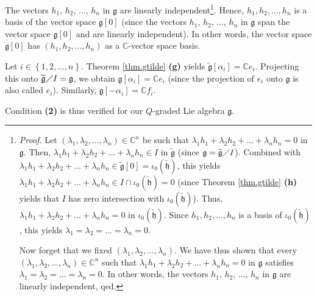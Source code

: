 \documentclass[etingof-lie.tex]{subfiles}
\begin{document}
The vectors $h_{1}$, $h_{2}$, $...$, $h_{n}$ in $\mathfrak{g}$ are linearly
independent\footnote{\textit{Proof.} Let $\left(  \lambda_{1},\lambda
_{2},...,\lambda_{n}\right)  \in\mathbb{C}^{n}$ be such that $\lambda_{1}%
h_{1}+\lambda_{2}h_{2}+...+\lambda_{n}h_{n}=0$ in $\mathfrak{g}$. Then,
$\lambda_{1}h_{1}+\lambda_{2}h_{2}+...+\lambda_{n}h_{n}\in I$ in
$\widetilde{\mathfrak{g}}$ (since $\mathfrak{g}=\widetilde{\mathfrak{g}%
}\diagup I$). Combined with $\lambda_{1}h_{1}+\lambda_{2}h_{2}+...+\lambda
_{n}h_{n}\in\widetilde{\mathfrak{g}}\left[  0\right]  =\iota_{0}\left(
\widetilde{\mathfrak{h}}\right)  $, this yields $\lambda_{1}h_{1}+\lambda
_{2}h_{2}+...+\lambda_{n}h_{n}\in I\cap\iota_{0}\left(
\widetilde{\mathfrak{h}}\right)  =0$ (since Theorem \ref{thm.gtilde}
\textbf{(h)} yields that $I$ has zero intersection with $\iota_{0}\left(
\widetilde{\mathfrak{h}}\right)  $). Thus, $\lambda_{1}h_{1}+\lambda_{2}%
h_{2}+...+\lambda_{n}h_{n}=0$ in $\iota_{0}\left(  \widetilde{\mathfrak{h}%
}\right)  $. Since $h_{1},h_{2},...,h_{n}$ is a basis of $\iota_{0}\left(
\widetilde{\mathfrak{h}}\right)  $, this yields $\lambda_{1}=\lambda
_{2}=...=\lambda_{n}=0$.
\par
Now forget that we fixed $\left(  \lambda_{1},\lambda_{2},...,\lambda
_{n}\right)  $. We have thus shown that every $\left(  \lambda_{1},\lambda
_{2},...,\lambda_{n}\right)  \in\mathbb{C}^{n}$ such that $\lambda_{1}%
h_{1}+\lambda_{2}h_{2}+...+\lambda_{n}h_{n}=0$ in $\mathfrak{g}$ satisfies
$\lambda_{1}=\lambda_{2}=...=\lambda_{n}=0$. In other words, the vectors
$h_{1}$, $h_{2}$, $...$, $h_{n}$ in $\mathfrak{g}$ are linearly independent,
qed.}. Hence, $h_{1},h_{2},...,h_{n}$ is a basis of the vector space
$\mathfrak{g}\left[  0\right]  $ (since the vectors $h_{1}$, $h_{2}$, $...$,
$h_{n}$ in $\mathfrak{g}$ span the vector space $\mathfrak{g}\left[  0\right]
$ and are linearly independent). In other words, the vector space
$\mathfrak{g}\left[  0\right]  $ has $\left(  h_{1},h_{2},...,h_{n}\right)  $
as a $\mathbb{C}$-vector space basis.

Let $i\in\left\{  1,2,...,n\right\}  $. Theorem \ref{thm.gtilde} \textbf{(g)}
yields $\widetilde{\mathfrak{g}}\left[  \alpha_{i}\right]  =\mathbb{C}e_{i}$.
Projecting this onto $\widetilde{\mathfrak{g}}\diagup I=\mathfrak{g}$, we
obtain $\mathfrak{g}\left[  \alpha_{i}\right]  =\mathbb{C}e_{i}$ (since the
projection of $e_{i}$ onto $\mathfrak{g}$ is also called $e_{i}$). Similarly,
$\mathfrak{g}\left[  -\alpha_{i}\right]  =\mathbb{C}f_{i}$.

Condition \textbf{(2)} is thus verified for our $Q$-graded Lie algebra
$\mathfrak{g}$.
\end{document}
